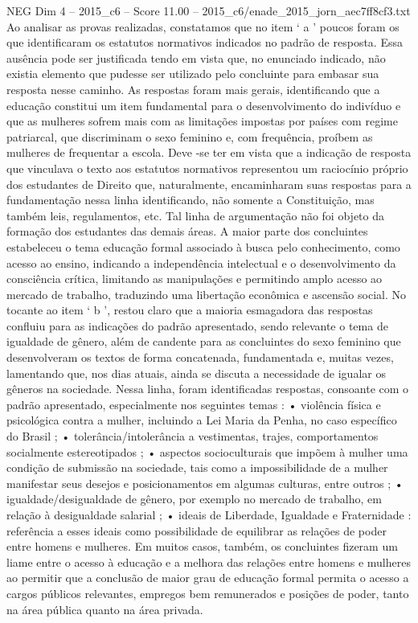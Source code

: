 \begin{textsample}{NEG Dim 4 – 2015\_c6 – Score 11.00 – 2015\_c6/enade\_2015\_jorn\_aec7ff8cf3.txt}
Ao analisar as provas realizadas, constatamos que no item ‘ a ’ poucos foram os que identificaram os estatutos normativos indicados no padrão de resposta.
Essa ausência pode ser justificada tendo em vista que, no enunciado indicado, não existia elemento que pudesse ser utilizado pelo concluinte para embasar sua resposta nesse caminho.
As respostas foram mais gerais, identificando que a educação constitui um item fundamental para o desenvolvimento do indivíduo e que as mulheres sofrem mais com as limitações impostas por países com regime patriarcal, que discriminam o sexo feminino e, com frequência, proíbem as mulheres de frequentar a escola.
Deve -se ter em vista que a indicação de resposta que vinculava o texto aos estatutos normativos representou um raciocínio próprio dos estudantes de Direito que, naturalmente, encaminharam suas respostas para a fundamentação nessa linha identificando, não somente a Constituição, mas também leis, regulamentos, etc.
Tal linha de argumentação não foi objeto da formação dos estudantes das demais áreas.
A maior parte dos concluintes estabeleceu o tema educação formal associado à busca pelo conhecimento, como acesso ao ensino, indicando a independência intelectual e o desenvolvimento da consciência crítica, limitando as manipulações e permitindo amplo acesso ao mercado de trabalho, traduzindo uma libertação econômica e ascensão social.
No tocante ao item ‘ b ’, restou claro que a maioria esmagadora das respostas confluiu para as indicações do padrão apresentado, sendo relevante o tema de igualdade de gênero, além de candente para as concluintes do sexo feminino que desenvolveram os textos de forma concatenada, fundamentada e, muitas vezes, lamentando que, nos dias atuais, ainda se discuta a necessidade de igualar os gêneros na sociedade.
Nessa linha, foram identificadas respostas, consoante com o padrão apresentado, especialmente nos seguintes temas : • violência física e psicológica contra a mulher, incluindo a Lei Maria da Penha, no caso específico do Brasil ; • tolerância/intolerância a vestimentas, trajes, comportamentos socialmente estereotipados ; • aspectos socioculturais que impõem à mulher uma condição de submissão na sociedade, tais como a impossibilidade de a mulher manifestar seus desejos e posicionamentos em algumas culturas, entre outros ; • igualdade/desigualdade de gênero, por exemplo no mercado de trabalho, em relação à desigualdade salarial ; • ideais de Liberdade, Igualdade e Fraternidade : referência a esses ideais como possibilidade de equilibrar as relações de poder entre homens e mulheres.
Em muitos casos, também, os concluintes fizeram um liame entre o acesso à educação e a melhora das relações entre homens e mulheres ao permitir que a conclusão de maior grau de educação formal permita o acesso a cargos públicos relevantes, empregos bem remunerados e posições de poder, tanto na área pública quanto na área privada.

\end{textsample}
